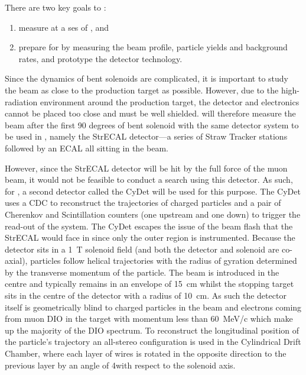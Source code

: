 There are two key goals to \phaseI:
\begin{enumerate}
	\item measure \mueconv at a \acf{ses} of \sensePI, and
\item prepare for \phaseII by measuring the beam profile, particle yields and background rates, and prototype the detector technology.
\end{enumerate}
Since the dynamics of bent solenoids are complicated, it is important to study the beam as close to the production target as possible.
However, due to the high-radiation environment around the production target, the detector and electronics cannot be placed too close and must be well shielded.
\phaseI will therefore measure the beam after the first 90 degrees of bent solenoid with the same detector system to be used in \phaseII, namely the \ac{StrECAL} detector---a series of Straw Tracker stations  followed by an ECAL
all sitting in the beam.  

However, since the StrECAL detector will be hit by the full force of the muon beam, it would not be feasible to conduct a \mueconv search using this detector.
As such, for \phaseI, a second detector called the \ac{CyDet} will be used for this purpose.
The \ac{CyDet} uses a \ac{CDC} to reconstruct the trajectories of charged particles and a pair of Cherenkov and Scintillation counters (one upstream and one down) to trigger the read-out of the system.
The \ac{CyDet} escapes the issue of the beam flash that the \ac{StrECAL} would face in \phaseI since only the outer region is instrumented.
Because the detector sits in a 1~T solenoid field (and both the detector and solenoid are co-axial), particles follow helical trajectories with the radius of gyration determined by the transverse momentum of the particle.
The beam is introduced in the centre and typically remains in an envelope of 15~cm whilst the stopping target sits in the centre of the detector with a radius of 10~cm.
As such the detector itself is geometrically blind to charged particles in the beam and electrons coming from muon \ac{DIO} in the target with momentum less than 60~MeV/c which make up the majority of the \ac{DIO} spectrum.
To reconstruct the longitudinal position of the particle's trajectory an all-stereo configuration is used in the Cylindrical Drift Chamber, where each layer of wires is rotated in the opposite direction to the previous layer by an angle of 4\degree with respect to the solenoid axis.

